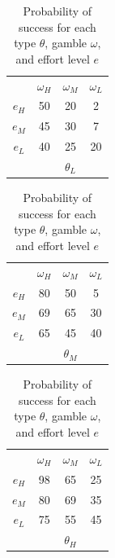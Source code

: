 \documentclass[
  12pt,
]{article}
\begin{document}
\begin{table}[htbp]
\centering

\begin{tabular}{ c|c|c|c|}
  
  \multicolumn{1}{c}{} & \multicolumn{1}{c}{$\omega_H$} & \multicolumn{1}{c}{$\omega_M$} & \multicolumn{1}{c}{$\omega_L$}\\
  \cline{2-4}
  $e_H$ & 50 & 20 & 2 \\
  \cline{2-4}
  $e_M$ & 45 & 30 & 7 \\
  \cline{2-4}
  $e_L$ & 40 & 25 & 20 \\

  \cline{2-4}
  \multicolumn{1}{c}{} & \multicolumn{1}{c}{} & \multicolumn{1}{c}{$\theta_L$} & \multicolumn{1}{c}{}\\
\end{tabular}
\hspace{.3cm} 
\begin{tabular}{ c|c|c|c|}
  
  \multicolumn{1}{c}{} & \multicolumn{1}{c}{$\omega_H$} & \multicolumn{1}{c}{$\omega_M$} & \multicolumn{1}{c}{$\omega_L$}\\
  \cline{2-4}
  $e_H$ & 80 & 50 & 5 \\
  \cline{2-4}
  $e_M$ & 69 & 65 & 30 \\
  \cline{2-4}
  $e_L$ & 65 & 45 & 40 \\
  \cline{2-4}
  \multicolumn{1}{c}{} & \multicolumn{1}{c}{} & \multicolumn{1}{c}{$\theta_M$} & \multicolumn{1}{c}{}\\
\end{tabular}
\hspace{.3cm} 
\begin{tabular}{ c|c|c|c|}
  
  \multicolumn{1}{c}{} & \multicolumn{1}{c}{$\omega_H$} & \multicolumn{1}{c}{$\omega_M$} & \multicolumn{1}{c}{$\omega_L$}\\
  \cline{2-4}
  $e_H$ & 98 & 65 & 25 \\
  \cline{2-4}
  $e_M$ & 80 & 69 & 35 \\
  \cline{2-4}
  $e_L$ & 75 & 55 & 45 \\
  \cline{2-4}
  \multicolumn{1}{c}{} & \multicolumn{1}{c}{} & \multicolumn{1}{c}{$\theta_H$} & \multicolumn{1}{c}{}\\
\end{tabular}

\caption{Probability of success for each type $\theta$, gamble $\omega$, and effort level $e$}
\label{tab:DGP}
\end{table}
\end{document}
